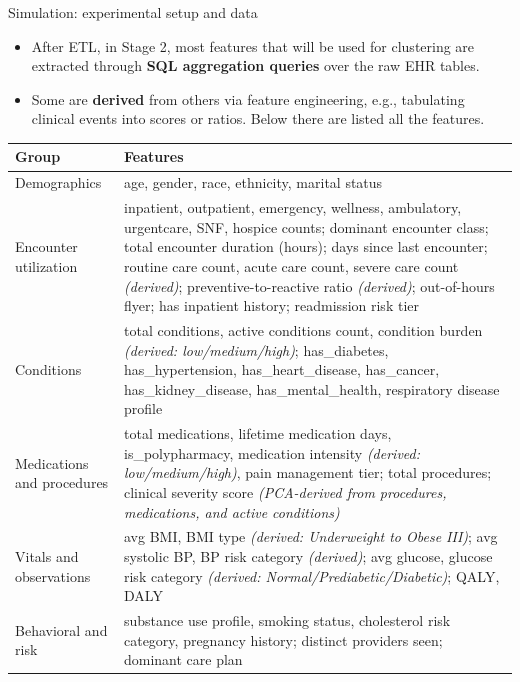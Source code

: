 \documentclass[aspectratio=169,11pt]{beamer}
\newcommand{\kw}[1]{{\color{hospaccent}\bfseries #1}}
\begin{document}
\begin{frame}{Simulation: experimental setup and data}
  \small
  \begin{itemize}
    \item After ETL, in Stage 2, most features that will be used for clustering are extracted through \kw{SQL aggregation queries} over the raw EHR tables.
    \item Some are \kw{derived} from others via feature engineering, e.g., tabulating clinical events into scores or ratios. Below there are listed all the features.
  \end{itemize}
  \vspace{0.2em}
  \centering
  \tiny
  \renewcommand{\arraystretch}{1.15}
  \begin{tabular}{@{}>{\raggedright\arraybackslash}p{2.0cm} >{\raggedright\arraybackslash}p{9.8cm}@{}}
    \toprule
    \textbf{Group} & \textbf{Features} \\
    \midrule
    Demographics &
      age, gender, race, ethnicity, marital status \\
    Encounter utilization &
      inpatient, outpatient, emergency, wellness, ambulatory, urgentcare, SNF, hospice counts;
      dominant encounter class; total encounter duration (hours); days since last encounter;
      routine care count, acute care count, severe care count \textit{(derived)};
      preventive-to-reactive ratio \textit{(derived)}; out-of-hours flyer; has inpatient history; readmission risk tier \\
    Conditions &
      total conditions, active conditions count, condition burden \textit{(derived: low/medium/high)};
      has\_diabetes, has\_hypertension, has\_heart\_disease, has\_cancer, has\_kidney\_disease,
      has\_mental\_health, respiratory disease profile \\
    Medications and procedures &
      total medications, lifetime medication days, is\_polypharmacy, medication intensity \textit{(derived: low/medium/high)},
      pain management tier; total procedures;
      clinical severity score \textit{(PCA-derived from procedures, medications, and active conditions)} \\
    Vitals and observations &
      avg BMI, BMI type \textit{(derived: Underweight to Obese III)};
      avg systolic BP, BP risk category \textit{(derived)};
      avg glucose, glucose risk category \textit{(derived: Normal/Prediabetic/Diabetic)};
      QALY, DALY \\
    Behavioral and risk &
      substance use profile, smoking status, cholesterol risk category,
      pregnancy history; distinct providers seen; dominant care plan \\
    \bottomrule
  \end{tabular}
\end{frame}
\end{document}
